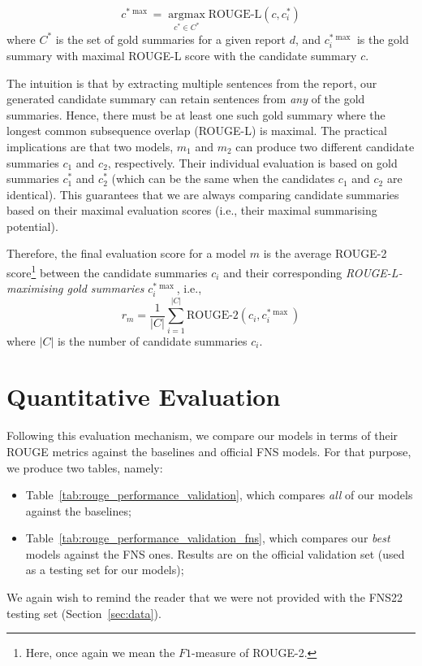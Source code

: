 \begin{equation}\label{eq:rouge_max}
    c^{*\max} = \underset{c^{*} \in C^{*}}{\operatorname{argmax}} \text{ROUGE-L}(c, c^{*}_{i})
\end{equation}
where $C^{*}$ is the set of gold summaries for a given report $d$, and $c^{*\max}_{i}$ is the gold summary with maximal ROUGE-L score with the candidate summary $c$.

The intuition is that by extracting multiple sentences from the report, our generated candidate summary can
retain sentences from \emph{any} of the gold summaries.
Hence, there must be at least one such gold summary where the longest common subsequence overlap (ROUGE-L) is maximal.
The practical implications are that two models, $m_{1}$ and $m_{2}$ can produce two different candidate summaries
$c_{1}$ and $c_{2}$, respectively.
Their individual evaluation is based on gold summaries $c^{*}_{1}$ and $c^{*}_{2}$ (which can be the same when the
candidates $c_{1}$ and $c_{2}$ are identical).
This guarantees that we are always comparing candidate summaries based on their maximal evaluation scores (i.e., their maximal summarising potential).

Therefore, the final evaluation score for a model $m$ is the average ROUGE-2 score\footnote{
    Here, once again we mean the $F1$-measure of ROUGE-2.
} between the candidate summaries $c_{i}$ and their corresponding \emph{ROUGE-L-maximising gold summaries} $c^{*\max}_{i}$, i.e.,
\begin{equation}\label{eq:rouge_final}
    r_{m} = \frac{1}{|C|} \sum_{i=1}^{|C|} \text{ROUGE-2}(c_{i}, c^{*\max}_{i})
\end{equation}
where $|C|$ is the number of candidate summaries $c_{i}$.

\section{Quantitative Evaluation}\label{sec:quantitative-evaluation}
Following this evaluation mechanism, we compare our models in terms of their ROUGE metrics against the baselines and official FNS models.
For that purpose, we produce two tables, namely:
\begin{itemize}
    \item Table~\ref{tab:rouge_performance_validation}, which compares \emph{all} of our models against the baselines;
    \item Table~\ref{tab:rouge_performance_validation_fns}, which compares our \emph{best} models against the FNS ones.
    Results are on the official validation set (used as a testing set for our models);
\end{itemize}
We again wish to remind the reader that we were not provided with the FNS22 testing set (Section~\ref{sec:data}).

